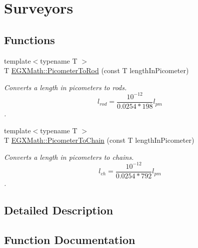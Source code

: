 \hypertarget{group___e_g_x_math-_conversions-_length_conversions-_s_i-_picometer-_surveyors}{}\section{Surveyors}
\label{group___e_g_x_math-_conversions-_length_conversions-_s_i-_picometer-_surveyors}
\subsection*{Functions}
\begin{DoxyCompactItemize}
\item 
{\footnotesize template$<$typename T $>$ }\\T \mbox{\hyperlink{group___e_g_x_math-_conversions-_length_conversions-_s_i-_picometer-_surveyors_gad6009949eef7a49d34a7fa859ecdf0c6}{E\+G\+X\+Math\+::\+Picometer\+To\+Rod}} (const T length\+In\+Picometer)
\begin{DoxyCompactList}\small\item\em Converts a length in picometers to rods. \[ l_{rod}= \frac{10^{-12}}{0.0254 * 198} l_{pm} \]. \end{DoxyCompactList}\item 
{\footnotesize template$<$typename T $>$ }\\T \mbox{\hyperlink{group___e_g_x_math-_conversions-_length_conversions-_s_i-_picometer-_surveyors_gae6629983b2f6ff484d0fc5c773193763}{E\+G\+X\+Math\+::\+Picometer\+To\+Chain}} (const T length\+In\+Picometer)
\begin{DoxyCompactList}\small\item\em Converts a length in picometers to chains. \[ l_{ch}= \frac{10^{-12}}{0.0254 * 792} l_{pm} \]. \end{DoxyCompactList}\end{DoxyCompactItemize}


\subsection{Detailed Description}


\subsection{Function Documentation}
\mbox{\label{group___e_g_x_math-_conversions-_length_conversions-_s_i-_picometer-_surveyors_gae6629983b2f6ff484d0fc5c773193763}} 
